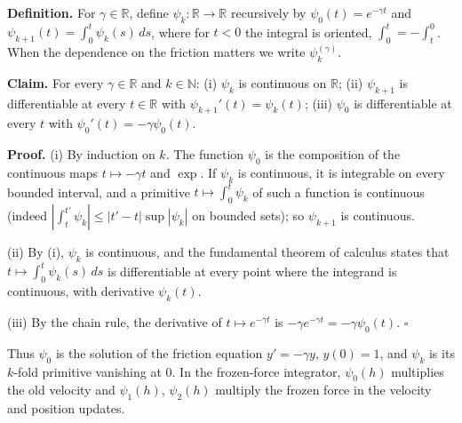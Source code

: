\documentclass[11pt,a4paper]{article}
\begin{document}
\textbf{Definition.} For \(\gamma\in\mathbb R\), define \(\psi_k:\mathbb R\to\mathbb R\) recursively by \(\psi_0(t)=e^{-\gamma t}\) and \(\psi_{k+1}(t)=\int_0^t\psi_k(s)\,ds\), where for \(t<0\) the integral is oriented, \(\int_0^t=-\int_t^0\). When the dependence on the friction matters we write \(\psi_k^{(\gamma)}\).




\textbf{Claim.} For every \(\gamma\in\mathbb R\) and \(k\in\mathbb N\): (i) \(\psi_k\) is continuous on \(\mathbb R\); (ii) \(\psi_{k+1}\) is differentiable at every \(t\in\mathbb R\) with \(\psi_{k+1}'(t)=\psi_k(t)\); (iii) \(\psi_0\) is differentiable at every \(t\) with \(\psi_0'(t)=-\gamma\psi_0(t)\).




\textbf{Proof.} (i) By induction on \(k\). The function \(\psi_0\) is the composition of the continuous maps \(t\mapsto-\gamma t\) and \(\exp\). If \(\psi_k\) is continuous, it is integrable on every bounded interval, and a primitive \(t\mapsto\int_0^t\psi_k\) of such a function is continuous (indeed \(|\int_t^{t'}\psi_k|\le|t'-t|\sup|\psi_k|\) on bounded sets); so \(\psi_{k+1}\) is continuous.




(ii) By (i), \(\psi_k\) is continuous, and the fundamental theorem of calculus states that \(t\mapsto\int_0^t\psi_k(s)\,ds\) is differentiable at every point where the integrand is continuous, with derivative \(\psi_k(t)\).




(iii) By the chain rule, the derivative of \(t\mapsto e^{-\gamma t}\) is \(-\gamma e^{-\gamma t}=-\gamma\psi_0(t)\). \(\square\)




Thus \(\psi_0\) is the solution of the friction equation \(y'=-\gamma y\), \(y(0)=1\), and \(\psi_{k}\) is its \(k\)-fold primitive vanishing at \(0\). In the frozen-force integrator, \(\psi_0(h)\) multiplies the old velocity and \(\psi_1(h)\), \(\psi_2(h)\) multiply the frozen force in the velocity and position updates.
\end{document}
